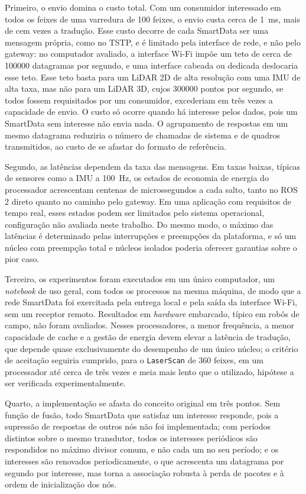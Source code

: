 \documentclass[
    12pt,
    oneside,
    a4paper,
    chapter=TITLE,
    section=TITLE,
    english,
    brazil
]{abntex2}
\begin{document}
Primeiro, o envio domina o custo total. Com um consumidor interessado em
todos os feixes de uma varredura de 100 feixes, o envio custa cerca de
\SI{1}{\milli\second}, mais de cem vezes a tradução. Esse custo decorre de
cada SmartData ser uma mensagem própria, como no TSTP, e é limitado pela
interface de rede, e não pelo gateway: no computador avaliado, a interface
Wi-Fi impõe um teto de cerca de \num{100000} datagramas por segundo, e uma
interface cabeada ou dedicada deslocaria esse teto. Esse teto basta para
um LiDAR 2D de alta resolução com uma IMU de alta taxa, mas não para um
LiDAR 3D, cujos \num{300000} pontos por segundo, se todos fossem
requisitados por um consumidor, excederiam em três vezes a capacidade de
envio. O custo só ocorre
quando há interesse pelos dados, pois um SmartData sem interesse não envia
nada. O agrupamento de respostas em um mesmo datagrama reduziria o número
de chamadas de sistema e de quadros transmitidos, ao custo de se afastar
do formato de referência.

Segundo, as latências dependem da taxa das mensagens. Em taxas baixas,
típicas de sensores como a IMU a \SI{100}{\hertz}, os estados de economia
de energia do processador acrescentam centenas de microssegundos a cada
salto, tanto no ROS 2 direto quanto no caminho pelo gateway. Em uma
aplicação com requisitos de tempo real, esses estados podem ser limitados
pelo sistema operacional, configuração não avaliada neste trabalho. Do
mesmo modo, o máximo das latências é determinado pelas interrupções e
preempções da plataforma, e só um núcleo com preempção total e núcleos
isolados poderia oferecer garantias sobre o pior caso.

Terceiro, os experimentos foram executados em um único computador, um
\textit{notebook} de uso geral, com todos os processos na mesma máquina,
de modo que a rede SmartData foi exercitada pela entrega local e pela
saída da interface Wi-Fi, sem um receptor remoto. Resultados em
\textit{hardware} embarcado, típico em robôs de campo, não foram
avaliados. Nesses processadores, a menor frequência, a menor capacidade de
cache e a gestão de energia devem elevar a latência de tradução, que
depende quase exclusivamente do desempenho de um único núcleo; o critério
de aceitação seguiria cumprido, para o \texttt{LaserScan} de 360 feixes,
em um processador até cerca de três vezes e meia mais lento que o
utilizado, hipótese a ser verificada experimentalmente.

Quarto, a implementação se afasta do conceito original em três pontos.
Sem função de fusão, todo SmartData que satisfaz um interesse responde,
pois a supressão de respostas de outros nós não foi implementada; com
períodos distintos sobre o mesmo transdutor, todos os interesses
periódicos são respondidos no máximo divisor comum, e não cada um no seu
período; e os interesses são renovados periodicamente, o que acrescenta
um datagrama por segundo por interesse, mas torna a associação robusta à
perda de pacotes e à ordem de inicialização dos nós.
\end{document}
